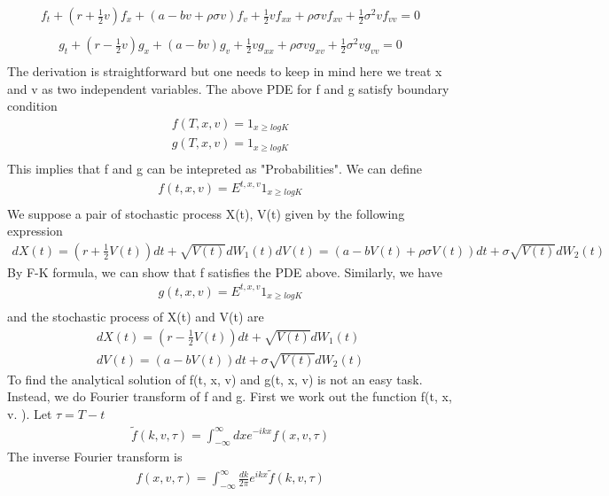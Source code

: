 \documentclass[a4paper]{article}
\begin{document}
\begin{align} \label{f}
	f_t + (r + \frac{1}{2}v)f_x + (a-bv+\rho \sigma v)f_v 
	+ \frac{1}{2}  v f_{xx} + \rho \sigma vf_{xv}
        +\frac{1}{2} \sigma^2 vf_{vv} = 0\\
\end{align}
\begin{align}
	g_t + (r - \frac{1}{2}v)g_x + (a-bv)g_v 
	+ \frac{1}{2}  v g_{xx} + \rho \sigma vg_{xv}
        +\frac{1}{2} \sigma^2 vg_{vv} = 0\\
\end{align}
The derivation is straightforward but one needs to keep in mind here we treat x and v as two independent variables. The above PDE for f and g satisfy boundary condition
\begin{align*}
	f(T, x, v) = 1_{x\geq logK}\\
	g(T, x, v) = 1_{x\geq logK}\\
\end{align*}
This implies that f and g can be intepreted as "Probabilities". We can define
\begin{align*}
	f(t, x, v) = E^{t,x,v}1_{x\geq logK}\\
\end{align*}
We suppose a pair of stochastic process X(t), V(t) given by the following expression
\begin{align*}
	dX(t) = (r+\frac{1}{2}V(t))dt + \sqrt{V(t)}dW_1(t)
	dV(t) = (a-bV(t)+ \rho \sigma V(t))dt + \sigma \sqrt{V(t)}dW_2(t)
\end{align*}
By F-K formula, we can show that f satisfies the PDE above. Similarly, we have
\begin{align*}
	g(t, x, v) = E^{t,x,v} 1_{x\geq logK}\\
\end{align*}
and the stochastic process of X(t) and V(t) are
\begin{align*}
	dX(t) = (r-\frac{1}{2}V(t))dt + \sqrt{V(t)}dW_1(t)\\
	dV(t) = (a-bV(t))dt + \sigma \sqrt{V(t)}dW_2(t)
\end{align*}
To find the analytical solution of f(t, x, v) and g(t, x, v) is not an easy task. Instead, we do Fourier transform of f and g. 
First we work out the function f(t, x, v. ). Let $\tau = T-t$
\begin{align*}
	\tilde f(k, v, \tau) = \int_{-\infty}^{\infty}dx e^{-ikx}f(x, v, \tau)
\end{align*}
The inverse Fourier transform is
\begin{align*}
	f(x, v, \tau) = \int_{-\infty}^{\infty}\frac{dk}{2\pi} e^{ikx}
	\tilde f(k, v, \tau)
\end{align*}
\end{document}
